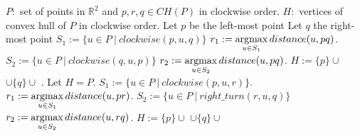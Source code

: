 \noindent\begin{minipage}{.5\textwidth}
\begin{algorithm}[H]
\begin{algorithmic}[1]
    \Require $P: $ set of points in $\mathbb{R}^2$ 
        and $p, r, q \in CH(P)$ in clockwise order.
    \Ensure $H: $ vertices of convex hull of $P$ in clockwise order.
    \State Let $p$ be the left-most point
    \State Let $q$ the right-most point
    \State $S_1 := \{u \in P \ | \ clockwise(p, u, q)\}$
    \State $r_1 := \operatorname*{argmax}\limits_{u \in S_1}distance(u, pq)$.
    \State $S_2 := \{u \in P \ | \ clockwise(q, u, p)\}$
    \State $r_2 := \operatorname*{argmax}\limits_{u \in S_2}distance(u, pq)$.
    \State $H := \{p\} \cup $ 
            $\cup \{q\} \cup$ .
            \State Let $H = P$.
        \Else{}
            \State $S_1 := \{u \in P \ | \ clockwise(p, u, r)\}$.
            \State $r_1 := \operatorname*{argmax}\limits_{u \in S_1}distance(u, pr)$.
            \State $S_2 := \{u \in P \ | \ right\_turn(r, u, q)\}$
            \State $r_2 := \operatorname*{argmax}\limits_{u \in S_2}distance(u, rq)$.
            \State $H := \{p\} \cup $ 
                   $\cup \{q\} \cup$ 
        \EndIf
    \EndFunction
\end{algorithmic}
\label{alg:quickhull_basic}
\end{algorithm}
\end{minipage}
\hfill
